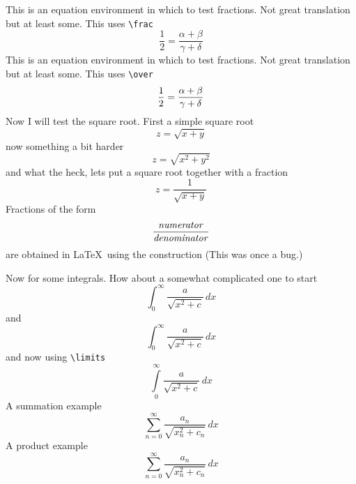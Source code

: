 \documentclass{article}
\begin{document}
This is an equation environment in which to test fractions.  Not great translation
but at least some.   This uses \verb#\frac#
$$
\frac{1}{2} = \frac{\alpha+\beta}{\gamma+\delta}
$$
This is an equation environment in which to test fractions.  Not great translation
but at least some.  This uses \verb#\over#
$$
{1 \over 2} = {\alpha+\beta \over \gamma+\delta}
$$
Now I will test the square root.  First a simple square root
$$
z = \sqrt{x+y}
$$
now something a bit harder
$$
z = \sqrt{x^2+y^2}
$$
and what the heck, lets put a square root together with a fraction
$$
z = \frac{1}{\sqrt{x+y}}
$$
Fractions of the form
\[ \frac{\mbox{\textit{numerator}}}{\mbox{\textit{denominator}}} \]
are obtained in \LaTeX\ using the construction (This was once a bug.)

Now for some integrals.  How about a somewhat complicated one to start
$$
\int_{0}^{\infty} \frac{a}{\sqrt{x^2+c}}\,dx
$$
and
$$
\int_0^\infty \frac{a}{\sqrt{x^2+c}}\,dx
$$
and now using \verb#\limits#
$$
\int \limits_0^\infty \frac{a}{\sqrt{x^2+c}}\,dx
$$
A summation example
$$
\sum_{n=0}^\infty \frac{a_n}{\sqrt{x_n^2+c_n}}\,dx
$$
A product example
$$
\sum_{n=0}^\infty \frac{a_n}{\sqrt{x_n^2+c_n}}\,dx
$$
\end{document}
